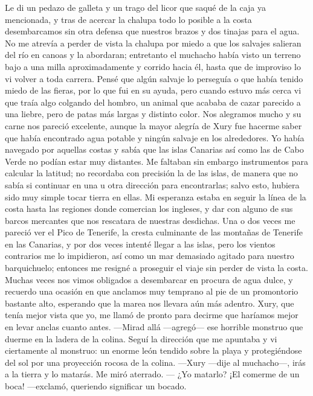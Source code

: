 \documentclass{novela}
\begin{document}
    Le di un pedazo de galleta y un trago del licor que saqué de la caja ya mencionada, y tras de acercar la chalupa todo lo posible a la costa desembarcamos sin otra defensa que nuestros brazos y dos tinajas para el agua.
    No me atrevía a perder de vista la chalupa por miedo a que los salvajes salieran del río en canoas y la abordaran; entretanto el muchacho había visto un terreno bajo a una milla aproximadamente y corrido hacia él, hasta que de improviso lo vi volver a toda carrera. Pensé que algún salvaje lo perseguía o que había tenido miedo de las fieras, por lo que fui en su ayuda, pero cuando estuvo más cerca vi que traía algo colgando del hombro, un animal que acababa de cazar parecido a una liebre, pero de patas más largas y distinto color. Nos alegramos mucho y su carne nos pareció excelente, aunque la mayor alegría de Xury fue hacerme saber que había encontrado agua potable y ningún salvaje en los alrededores.
    Yo había navegado por aquellas costas y sabía que las islas Canarias así como las de Cabo Verde no podían estar muy distantes. Me faltaban sin embargo instrumentos para calcular la latitud; no recordaba con precisión la de las islas, de manera que no sabía si continuar en una u otra dirección para encontrarlas; salvo esto, hubiera sido muy simple tocar tierra en ellas. Mi esperanza estaba en seguir la línea de la costa hasta las regiones donde comercian los ingleses, y dar con alguno de sus barcos mercantes que nos rescatara de nuestras desdichas.
    Una o dos veces me pareció ver el Pico de Tenerife, la cresta culminante de las montañas de Tenerife en las Canarias, y por dos veces intenté llegar a las islas, pero los vientos contrarios me lo impidieron, así como un mar demasiado agitado para nuestro barquichuelo; entonces me resigné a proseguir el viaje sin perder de vista la costa.
    Muchas veces nos vimos obligados a desembarcar en procura de agua dulce, y recuerdo una ocasión en que anclamos muy temprano al pie de un promontorio bastante alto, esperando que la marea nos llevara aún más adentro. Xury, que tenía mejor vista que yo, me llamó de pronto para decirme que haríamos mejor en levar anclas cuanto antes.
    —Mirad allá —agregó— ese horrible monstruo que duerme en la ladera de la colina.
    Seguí la dirección que me apuntaba y vi ciertamente al monstruo: un enorme león tendido sobre la playa y protegiéndose del sol por una proyección rocosa de la colina.
    —Xury —dije al muchacho—, irás a la tierra y lo matarás.
    Me miró aterrado.
    — ¿Yo matarlo? ¡El comerme de un boca! —exclamó, queriendo significar un bocado.
\end{document}
